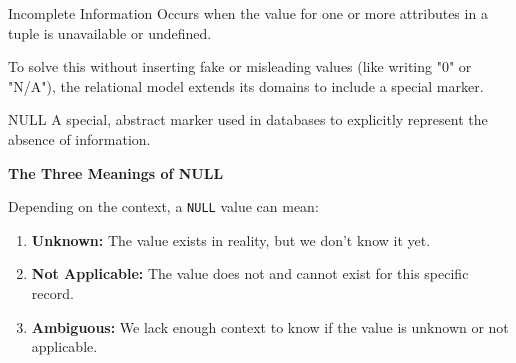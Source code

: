 \begin{defbox}{Incomplete Information}
Occurs when the value for one or more attributes in a tuple is unavailable or undefined.
\end{defbox}

To solve this without inserting fake or misleading values (like writing "0" or "N/A"), the relational model extends its domains to include a special marker.

\begin{defbox}{NULL}
A special, abstract marker used in databases to explicitly represent the absence of information.
\end{defbox}

\textbf{The Three Meanings of NULL}

Depending on the context, a \texttt{NULL} value can mean:
\begin{enumerate}
    \item \textbf{Unknown:} The value exists in reality, but we don't know it yet.
    \item \textbf{Not Applicable:} The value does not and cannot exist for this specific record.
    \item \textbf{Ambiguous:} We lack enough context to know if the value is unknown or not applicable.
\end{enumerate}


